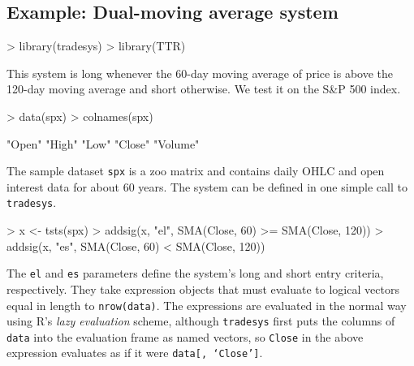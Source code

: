 \documentclass[a4]{article}
\newcommand{\code}[1]{\texttt{#1}}
\begin{document}
\subsection{Example: Dual-moving average system}
\begin{Schunk}
\begin{Sinput}
> library(tradesys)
> library(TTR)
\end{Sinput}
\end{Schunk}
This system is long whenever the 60-day moving average of price is
above the 120-day moving average and short otherwise. We test it on
the S\&P 500 index.
\begin{Schunk}
\begin{Sinput}
> data(spx)
> colnames(spx)
\end{Sinput}
\begin{Soutput}
[1] "Open"   "High"   "Low"    "Close"  "Volume"
\end{Soutput}
\end{Schunk}
The sample dataset \code{spx} is a zoo matrix and contains daily
OHLC and open interest data for about 60 years. The system can be
defined in one simple call to \code{tradesys}.
\begin{Schunk}
\begin{Sinput}
> x <- tsts(spx)
> addsig(x, "el", SMA(Close, 60) >= SMA(Close, 120))
> addsig(x, "es", SMA(Close, 60) < SMA(Close, 120))
\end{Sinput}
\end{Schunk}
The \code{el} and \code{es} parameters define the system's long and
short entry criteria, respectively. They take expression objects that
must evaluate to logical vectors equal in length to \code{nrow(data)}.
The expressions are evaluated in the normal way using R's \emph{lazy
  evaluation} scheme, although \code{tradesys} first puts the columns
of \code{data} into the evaluation frame as named vectors, so
\code{Close} in the above expression evaluates as if it were
\code{data[, `Close']}.
\end{document}
